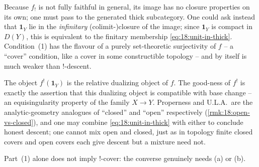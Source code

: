 \begin{remark}
\label{rmk:18:image-thick}
Because $f_!$ is not fully faithful in general, its image has no closure
properties on its own; one must pass to the generated thick subcategory. One could
ask instead that $\mathbf 1_Y$ lie in the \emph{infinitary} (colimit-)closure of
the image; since $\mathbf 1_Y$ is compact in $D(Y)$, this is equivalent to the
finitary membership \eqref{eq:18:unit-in-thick}. Condition~(1) has the flavour of a
purely set-theoretic surjectivity of $f$ -- a ``cover'' condition, like a cover in
some constructible topology -- and by itself is much weaker than $!$-descent.
\end{remark}

\begin{remark}
\label{rmk:18:ULA-meaning}
The object $f^!(\mathbf 1_Y)$ is the relative dualizing object of $f$. The good-ness
of $f^!$ is exactly the assertion that this dualizing object is compatible with
base change -- an equisingularity property of the family $X\to Y$. Properness and
U.L.A.\ are the analytic-geometry analogues of ``closed'' and ``open''
respectively (\cref{rmk:18:open-vs-closed}), and one may combine
\eqref{eq:18:unit-in-thick} with either to conclude honest descent; one cannot mix
open and closed, just as in topology finite closed covers and open covers each
give descent but a mixture need not.
\end{remark}

Part~(1) alone does not imply $!$-cover: the converse genuinely needs (a) or (b).

